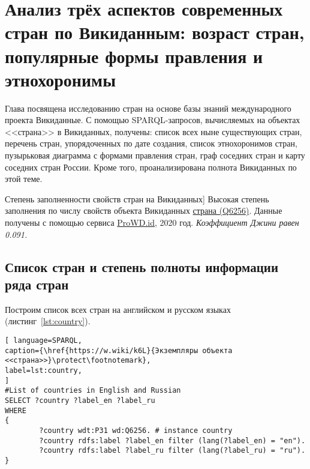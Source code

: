 \chapter[Анализ стран: возраст, формы правления и этнохоронимы]{Анализ трёх аспектов современных стран по Викиданным: возраст стран, популярные формы правления и этнохоронимы}
\label{ch:country}

Глава посвящена исследованию стран на основе базы знаний международного проекта Викиданные. С помощью SPARQL-запросов, вычисляемых на объектах <<страна>> в Викиданных, получены: список всех ныне существующих стран, перечень стран, упорядоченных по дате создания, список этнохоронимов стран, пузырьковая диаграмма с формами правления стран, граф соседних стран и карту соседних стран России. Кроме того, проанализирована полнота Викиданных по этой теме.

\begin{marginfigure}[0.0cm]
	{
		\setlength{\fboxsep}{0pt}%
		\setlength{\fboxrule}{1pt}%
	}
	\caption
	[Степень заполненности свойств стран на Викиданных]
	{
		Высокая степень заполнения по числу свойств объекта Викиданных \href{https://www.wikidata.org/wiki/Q6256}{страна (Q6256)}.  Данные получены с помощью сервиса \href{https://prowd.id/dashboards/86b6f91a8131/profile}{ProWD.id}, 2020 год. \emph{Коэффициент Джини равен 0.091.}
	}%
	\label{fig:ProWD_country}%
\end{marginfigure}


\section{Список стран и степень полноты информации ряда стран}

Построим список всех стран на английском и русском языках (листинг~\ref{lst:country}).

\begin{lstlisting}[ language=SPARQL, 
caption={\href{https://w.wiki/k6L}{Экземпляры объекта <<страна>>}\protect\footnotemark},
label=lst:country, 
]
#List of countries in English and Russian
SELECT ?country ?label_en ?label_ru
WHERE
{
		?country wdt:P31 wd:Q6256. # instance country
		?country rdfs:label ?label_en filter (lang(?label_en) = "en").
		?country rdfs:label ?label_ru filter (lang(?label_ru) = "ru").
}
\end{lstlisting}

